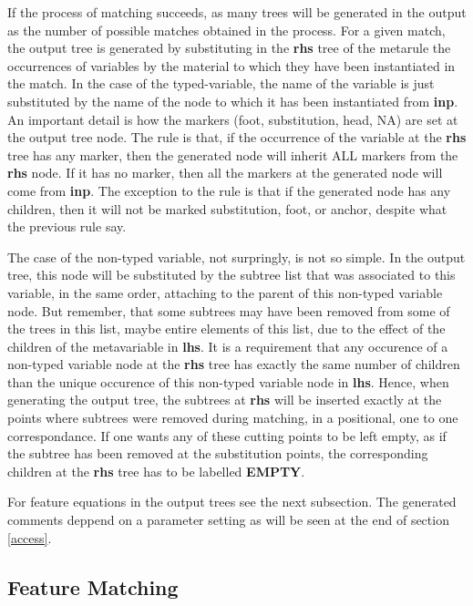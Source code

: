 If the process of matching succeeds, as many trees will be generated in the
output as the number of possible matches obtained in the process. For a 
given match, the output tree is generated by substituting in the {\bf rhs} tree
of the metarule the occurrences of variables by the material to which they have
been instantiated in the match. In the case of the typed-variable,
the name of the variable is just substituted by the name of the node to which
it has been instantiated from {\bf inp}. An important detail is how the
markers (foot, substitution, head, NA) are set at the output tree 
node. The rule is that, if the occurrence of the variable at the {\bf rhs}
tree has any marker, then the generated node will inherit ALL 
markers from the {\bf rhs} node. If it has no marker, then all the markers 
at the generated node will come from {\bf inp}. The exception to the rule is 
that if the generated node has any children, then it will not be marked
substitution, foot, or anchor, despite what the previous rule say.

The case of the non-typed variable, not surpringly, is not so simple. 
In the output tree, this node
will be substituted by the subtree list that was associated to this variable,
in the same order, attaching to the parent of this non-typed variable node.
But remember, that some subtrees may have been removed from some of the trees
in this list, maybe entire elements of this list, due to the effect of the
children of the metavariable in {\bf lhs}. 
It is a 
requirement that any occurence of a non-typed variable node at the {\bf rhs}
tree has exactly the same number of children than the unique occurence of
this non-typed variable node in {\bf lhs}. Hence, when generating the output
tree, the subtrees at {\bf rhs}
will be inserted exactly at the points where subtrees were removed during 
matching, in a positional, one to one correspondance. If one wants any
of these cutting points to be left empty, as if the subtree has been removed
at the substitution points, the corresponding children at the {\bf rhs} tree
has to be labelled {\bf EMPTY}.

For feature equations in the output trees see the next subsection. 
The generated comments deppend on a parameter setting as will be seen at the
end of section \ref{access}.

\subsection{Feature Matching}


